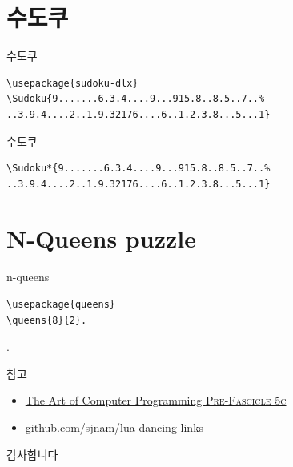 \documentclass{beamer}
\begin{document}
\section{수도쿠}

%
\begin{frame}[fragile]{수도쿠}
\begin{verbatim}
\usepackage{sudoku-dlx}
\Sudoku{9.......6.3.4....9...915.8..8.5..7..%
..3.9.4....2..1.9.32176....6..1.2.3.8...5...1}
\end{verbatim}  

\begin{center}
\end{center}
\end{frame}

%
\begin{frame}[fragile]{수도쿠}
\begin{verbatim}
\Sudoku*{9.......6.3.4....9...915.8..8.5..7..%
..3.9.4....2..1.9.32176....6..1.2.3.8...5...1}
\end{verbatim}

\begin{center}
\end{center}
\end{frame}

\section{N-Queens puzzle}

%
\begin{frame}[fragile]{n-queens}
\begin{verbatim}
\usepackage{queens}
\queens{8}{2}.
\end{verbatim}
\vspace{-10mm}
.
\end{frame}

%
\begin{frame}{참고}
  \begin{itemize}
  \item \href{http://www-cs-faculty.stanford.edu/~knuth/fasc5c.ps.gz}
    {The Art of Computer Programming \textsc{Pre-Fascicle 5c}}
  \item \href{https://github.com/sjnam/lua-dancing-links}
    {github.com/sjnam/lua-dancing-links}
  \end{itemize}
\end{frame}


%
\begin{frame}[standout]
  감사합니다
\end{frame}
\end{document}
